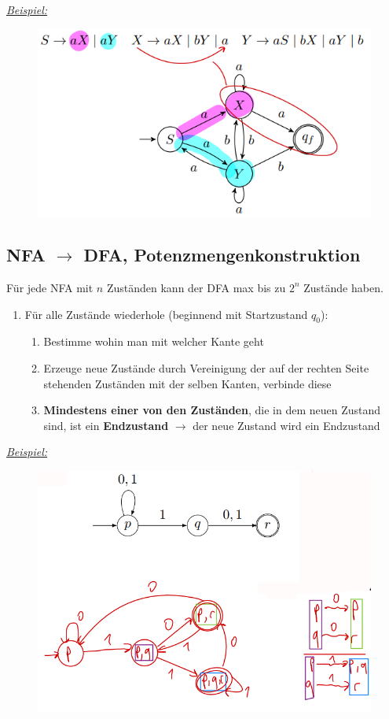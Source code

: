 \documentclass[ieeetran]{article}
\begin{document}
\textit{\underline{Beispiel:}}

\begin{figure}[h!]
  \centering
  \includegraphics[width=0.5\linewidth]{gramtonfa}
  \label{fig:gramtonfa}
\end{figure}

\subsection{NFA $\rightarrow$ DFA, Potenzmengenkonstruktion} %
\label{sub:nFA_dFA_potenzmengenkonstruktion}
Für jede NFA mit $n$ Zuständen kann der DFA max bis zu $2^n$ Zustände haben.

\begin{enumerate}
  \item Für alle Zustände wiederhole (beginnend mit Startzustand $q_0$):
     \begin{enumerate}
       \item Bestimme wohin man mit welcher Kante geht
	\item Erzeuge neue Zustände durch Vereinigung der auf der rechten Seite stehenden Zuständen mit der selben Kanten, verbinde diese
        \item \textbf{Mindestens einer von den Zuständen}, die in dem neuen Zustand sind, ist ein \textbf{Endzustand} $\rightarrow$ der neue Zustand wird ein Endzustand
     \end{enumerate}
\end{enumerate}

\hspace{-0.65cm} \textit{\underline{Beispiel:}}
\begin{figure}[h!]
  \centering
  \includegraphics[width=0.5\linewidth]{nfatodfa.png}
  \label{fig:nfatodfa_png}
\end{figure}
\end{document}

